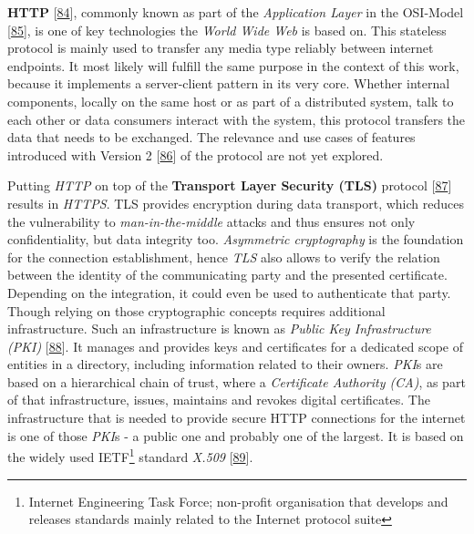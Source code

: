 \documentclass[12pt,english,a4paper,titlepage,cleardoublepage=empty,dottedtoc]{report}
\begin{document}
\textbf{\protect\hypertarget{def--http}{}{HTTP}}
{[}\protect\hyperlink{ref-web_spec_http1}{84}{]}, commonly known as part
of the \emph{Application Layer} in the OSI-Model
{[}\protect\hyperlink{ref-web_2017_wikipedia_osi-model}{85}{]}, is one
of key technologies the \emph{World Wide Web} is based on. This
stateless protocol is mainly used to transfer any media type reliably
between internet endpoints. It most likely will fulfill the same purpose
in the context of this work, because it implements a server-client
pattern in its very core. Whether internal components, locally on the
same host or as part of a distributed system, talk to each other or data
consumers interact with the system, this protocol transfers the data
that needs to be exchanged. The relevance and use cases of features
introduced with Version 2
{[}\protect\hyperlink{ref-web_spec_http2}{86}{]} of the protocol are not
yet explored.

Putting \emph{HTTP} on top of the \textbf{Transport Layer Security
(TLS)} protocol {[}\protect\hyperlink{ref-web_spec_tls}{87}{]} results
in \emph{\protect\hypertarget{def--https}{}{HTTPS}}. TLS provides
encryption during data transport, which reduces the vulnerability to
\emph{man-in-the-middle} attacks and thus ensures not only
confidentiality, but data integrity too. \emph{Asymmetric cryptography}
is the foundation for the connection establishment, hence \emph{TLS}
also allows to verify the relation between the identity of the
communicating party and the presented certificate. Depending on the
integration, it could even be used to authenticate that party. Though
relying on those cryptographic concepts requires additional
infrastructure. Such an infrastructure is known as \emph{Public Key
Infrastructure (PKI)}
{[}\protect\hyperlink{ref-book_2014_chapter-14-5-pki}{88}{]}. It manages
and provides keys and certificates for a dedicated scope of entities in
a directory, including information related to their owners. \emph{PKI}s
are based on a hierarchical chain of trust, where a \emph{Certificate
Authority (CA)}, as part of that infrastructure, issues, maintains and
revokes digital certificates. The infrastructure that is needed to
provide secure HTTP connections for the internet is one of those
\emph{PKI}s - a public one and probably one of the largest. It is based
on the widely used IETF\footnote{Internet Engineering Task Force;
  non-profit organisation that develops and releases standards mainly
  related to the Internet protocol suite} standard \emph{X.509}
{[}\protect\hyperlink{ref-web_spec_x509}{89}{]}.
\end{document}
